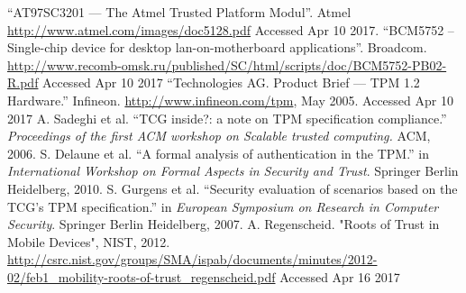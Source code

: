 \documentclass[12pt,lot, lof]{puthesis}
\begin{document}
\begin{flushleft}
\begin{footnotesize}
\begin{thebibliography}{\kern\bibindent}
     ``AT97SC3201 — The Atmel Trusted Platform Modul''. Atmel \url{http://www.atmel.com/images/doc5128.pdf} Accessed Apr 10 2017.
``BCM5752 -- Single-chip device for desktop lan-on-motherboard applications''. Broadcom. \url{http://www.recomb-omsk.ru/published/SC/html/scripts/doc/BCM5752-PB02-R.pdf} Accessed Apr 10 2017
     ``Technologies AG. Product Brief — TPM 1.2 Hardware.'' Infineon. \url{http://www.infineon.com/tpm}, May 2005. Accessed Apr 10 2017
    A. Sadeghi et al. ``TCG inside?: a note on TPM specification compliance.'' \textit{Proceedings of the first ACM workshop on Scalable trusted computing.} ACM, 2006.
    S. Delaune et al. ``A formal analysis of authentication in the TPM.'' in \textit{International Workshop on Formal Aspects in Security and Trust}. Springer Berlin Heidelberg, 2010.
    S. Gurgens et al. ``Security evaluation of scenarios based on the TCG’s TPM specification.'' in \textit{European Symposium on Research in Computer Security}. Springer Berlin Heidelberg, 2007.
    A. Regenscheid. "Roots of Trust in Mobile Devices", NIST, 2012. \url{http://csrc.nist.gov/groups/SMA/ispab/documents/minutes/2012-02/feb1\_mobility-roots-of-trust\_regenscheid.pdf} Accessed Apr 16 2017
\end{thebibliography}
\end{footnotesize}
\end{flushleft}
\end{document}
